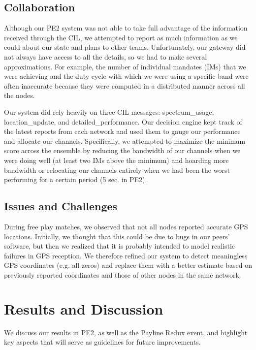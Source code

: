 \documentclass[11pt]{article}
\begin{document}
\subsection{Collaboration}

Although our PE2 system was not able to take full advantage of the information received through the CIL, we attempted to report as much information as we could about our state and plans to other teams. Unfortunately, our gateway did not always have access to all the details, so we had to make several approximations. For example, the number of individual mandates (IMs) that we were achieving and the duty cycle with which we were using a specific band were often inaccurate because they were computed in a distributed manner across all the nodes.

Our system did rely heavily on three CIL messages: spectrum\_usage, location\_update, and detailed\_performance. Our decision engine kept track of the latest reports from each network and used them to gauge our performance and allocate our channels. Specifically, we attempted to maximize the minimum score across the ensemble by reducing the bandwidth of our channels when we were doing well (at least two IMs above the minimum) and hoarding more bandwidth or relocating our channels entirely when we had been the worst performing for a certain period (5 sec. in PE2).

\subsection{Issues and Challenges}

During free play matches, we observed that not all nodes reported accurate GPS locations. Initially, we thought that this could be due to bugs in our peers' software, but then we realized that it is probably intended to model realistic failures in GPS reception. We therefore refined our system to detect meaningless GPS coordinates (e.g. all zeros) and replace them with a better estimate based on previously reported coordinates and those of other nodes in the same network.

\section{Results and Discussion}
We discuss our results in PE2, as well as the Payline Redux event, and highlight key aspects that will serve as guidelines for future improvements.
\end{document}
